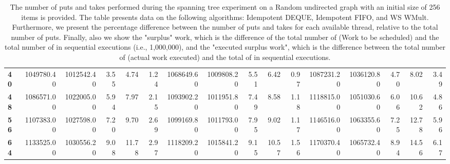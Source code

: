 \begin{table}[!ht]
{\begin{tabular}{lrrrrrrrrrrrrrrr}
\textbf{40} &       1049780.40 & 1012542.40 &           3.55 &        4.74 &                 1.24 &      1068649.60 & 1009808.20 &           5.51 &        6.42 &                 0.97 & 1087231.20 & 1036120.80 &           4.70 &        8.02 &                 3.49 \\
\textbf{48} &       1086571.00 & 1022005.00 &           5.94 &        7.97 &                 2.15 &      1093902.20 & 1011951.80 &           7.49 &        8.58 &                 1.18 & 1118815.00 & 1051030.60 &           6.06 &       10.62 &                 4.86 \\
\textbf{56} &       1107383.00 & 1027598.00 &           7.20 &        9.70 &                 2.69 &      1099169.80 & 1011793.00 &           7.95 &        9.02 &                 1.17 & 1146516.00 & 1063355.60 &           7.25 &       12.78 &                 5.96 \\
\textbf{64} &       1133525.00 & 1030556.20 &           9.08 &       11.78 &                 2.97 &      1118209.20 & 1015841.20 &           9.15 &       10.57 &                 1.56 & 1170370.40 & 1065732.40 &           8.94 &       14.56 &                 6.17 \\
\bottomrule
\end{tabular}}
\caption{\label{difference-Random_directed-256-IDEMPOTENT_DEQUE-IDEMPOTENT_FIFO-WS_NC_MULT_OPT}The number of puts and takes performed during the
    spanning tree experiment on a Random undirected graph with an initial size
    of 256 items is provided. The table presents data on the
    following algorithms: Idempotent DEQUE, Idempotent FIFO, and
    WS WMult. Furthermore, we present the percentage difference
    between the number of puts and takes for each available thread,
    relative to the total number of puts. Finally, also we show the
    "surplus" work, which is the difference of the total number of
    \Puts (Work to be scheduled) and the total number of \Puts in
    sequential executions (i.e., 1,000,000), and the "executed surplus
    work", which is the difference between the total number of \Takes
    (actual work executed) and the total of \Takes in sequential
    executions.}
\end{table}
